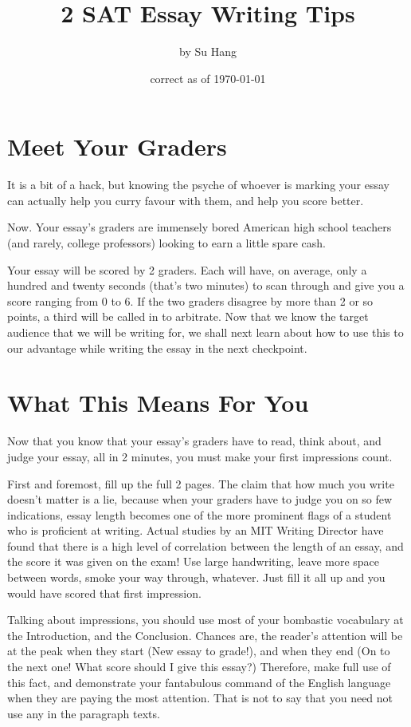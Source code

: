 \documentclass[DIV=calc,11pt,parskip,numbers=noenddot]{scrartcl} %
\title{2 SAT Essay Writing Tips}
\author{\large by Su Hang}
\date{\small correct as of \today}
\begin{document}
\maketitle
\section{Meet Your Graders}
It is a bit of a hack, but knowing the psyche of whoever is marking your essay can actually help you curry favour with them, and help you score better.

Now. Your essay’s graders are immensely bored American high school teachers (and rarely, college professors) looking to earn a little spare cash.

Your essay will be scored by 2 graders. Each will have, on average, only a hundred and twenty seconds (that's two minutes) to scan through and give you a score ranging from 0 to 6. If the two graders disagree by more than 2 or so points, a third will be called in to arbitrate. Now that we know the target audience that we will be writing for, we shall next learn about how to use this to our advantage while writing the essay in the next checkpoint.
\section{What This Means For You}
Now that you know that your essay’s graders have to read, think about, and judge your essay, all in 2 minutes, you must make your first impressions count.

First and foremost, fill up the full 2 pages. The claim that how much you write doesn’t matter is a lie, because when your graders have to judge you on so few indications, essay length becomes one of the more prominent flags of a student who is proficient at writing. Actual studies by an MIT Writing Director have found that there is a high level of correlation between the length of an essay, and the score it was given on the exam! Use large handwriting, leave more space between words, smoke your way through, whatever. Just fill it all up and you would have scored that first impression.

Talking about impressions, you should use most of your bombastic vocabulary at the Introduction, and the Conclusion. Chances are, the reader’s attention will be at the peak when they start (New essay to grade!), and when they end (On to the next one! What score should I give this essay?) Therefore, make full use of this fact, and demonstrate your fantabulous command of the English language when they are paying the most attention. That is not to say that you need not use any in the paragraph texts.
\end{document}
